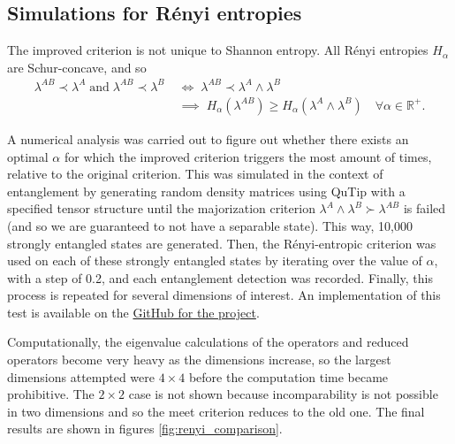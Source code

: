 \subsection{Simulations for R\'enyi entropies}

The improved criterion is not unique to Shannon entropy. All Rényi entropies $H_\alpha$ are Schur-concave, and so
\begin{align}
    \lambda^{AB} \prec \lambda^A \; \text{and} \; \lambda^{AB} \prec \lambda^{B} \; &\iff \; \lambda^{AB} \prec \lambda^A \wedge \lambda^B \;\\ &\implies \; H_\alpha(\lambda^{AB}) \geq H_\alpha(\lambda^A \wedge \lambda^B) \quad \forall \alpha \in \mathbb{R}^+.
\end{align}

A numerical analysis was carried out to figure out whether there exists an optimal $\alpha$ for which the improved criterion triggers the most amount of times, relative to the original criterion. This was simulated in the context of entanglement by generating random density matrices using QuTip with a specified tensor structure until the majorization criterion $\lambda^A \wedge \lambda^B \succ \lambda^{AB}$ is failed (and so we are guaranteed to not have a separable state). This way, 10,000 strongly entangled states are generated. Then, the Rényi-entropic criterion was used on each of these strongly entangled states by iterating over the value of $\alpha$, with a step of 0.2, and each entanglement detection was recorded. Finally, this process is repeated for several dimensions of interest. An implementation of this test is available on the \href{https://github.com/traaldbjerg/MajoLat}{GitHub for the project}.

Computationally, the eigenvalue calculations of the operators and reduced operators become very heavy as the dimensions increase, so the largest dimensions attempted were $4 \times 4$ before the computation time became prohibitive. The $2 \times 2$ case is not shown because incomparability is not possible in two dimensions and so the meet criterion reduces to the old one. The final results are shown in figures \ref{fig:renyi_comparison}.

